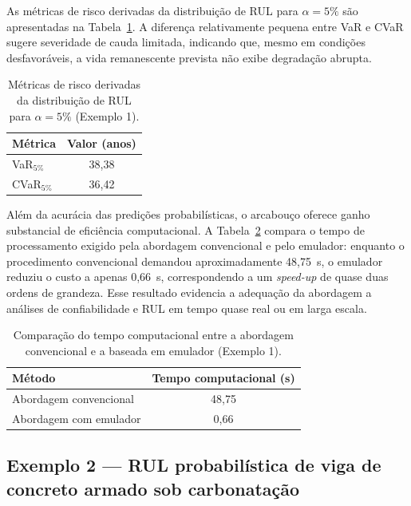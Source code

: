 As métricas de risco derivadas da distribuição de RUL para $\alpha = 5\%$ são apresentadas na Tabela~\ref{tab:var_cvar_rul}. A diferença relativamente pequena entre VaR e CVaR sugere severidade de cauda limitada, indicando que, mesmo em condições desfavoráveis, a vida remanescente prevista não exibe degradação abrupta.

\begin{table}[H]
\centering
\caption{Métricas de risco derivadas da distribuição de RUL para $\alpha = 5\%$ (Exemplo 1).}
\label{tab:var_cvar_rul}
\begin{tabular}{lc}
\hline
\textbf{Métrica} & \textbf{Valor (anos)} \\
\hline
VaR$_{5\%}$  & 38,38 \\
CVaR$_{5\%}$ & 36,42 \\
\hline
\end{tabular}
\end{table}

Além da acurácia das predições probabilísticas, o arcabouço oferece ganho substancial de eficiência computacional. A Tabela~\ref{tab:computational_time} compara o tempo de processamento exigido pela abordagem convencional e pelo emulador: enquanto o procedimento convencional demandou aproximadamente 48,75~s, o emulador reduziu o custo a apenas 0,66~s, correspondendo a um \textit{speed-up} de quase duas ordens de grandeza. Esse resultado evidencia a adequação da abordagem a análises de confiabilidade e RUL em tempo quase real ou em larga escala.

\begin{table}[H]
\centering
\caption{Comparação do tempo computacional entre a abordagem convencional e a baseada em emulador (Exemplo 1).}
\label{tab:computational_time}
\begin{tabular}{l c}
\hline
\textbf{Método} & \textbf{Tempo computacional (s)} \\
\hline
Abordagem convencional & 48,75 \\
Abordagem com emulador & 0,66 \\
\hline
\end{tabular}
\end{table}

\subsection{Exemplo 2 --- RUL probabilística de viga de concreto armado sob carbonatação}
\label{subsec:exemplo2}

